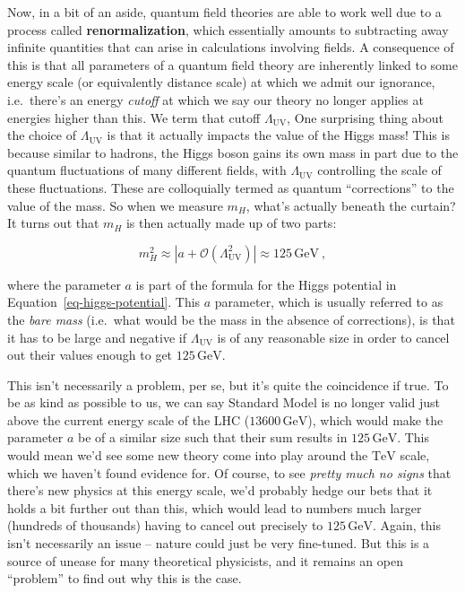 \documentclass[
  11pt,
  numbers=noendperiod]{book}
\begin{document}
Now, in a bit of an aside, quantum field theories are able to work well
due to a process called \textbf{renormalization}, which essentially
amounts to subtracting away infinite quantities that can arise in
calculations involving fields. A consequence of this is that all
parameters of a quantum field theory are inherently linked to some
energy scale (or equivalently distance scale) at which we admit our
ignorance, i.e.~there's an energy \emph{cutoff} at which we say our
theory no longer applies at energies higher than this. We term that
cutoff \(\Lambda_{\text{UV}}\), One surprising thing about the choice of
\(\Lambda_{\text{UV}}\) is that it actually impacts the value of the
Higgs mass! This is because similar to hadrons, the Higgs boson gains
its own mass in part due to the quantum fluctuations of many different
fields, with \(\Lambda_{\text{UV}}\) controlling the scale of these
fluctuations. These are colloquially termed as quantum ``corrections''
to the value of the mass. So when we measure \(m_H\), what's actually
beneath the curtain? It turns out that \(m_H\) is then actually made up
of two parts:

\[
m_H^2 \approx\left|a+\mathcal{O}\left(\Lambda_{\mathrm{UV}}^2\right)\right| \approx 125 \,\text{GeV}~,
\]

where the parameter \(a\) is part of the formula for the Higgs potential
in Equation~\ref{eq-higgs-potential}. This \(a\) parameter, which is
usually referred to as the \emph{bare mass} (i.e.~what would be the mass
in the absence of corrections), is that it has to be large and negative
if \(\Lambda_{\mathrm{UV}}\) is of any reasonable size in order to
cancel out their values enough to get \(125\,\text{GeV}\).

This isn't necessarily a problem, per se, but it's quite the coincidence
if true. To be as kind as possible to us, we can say Standard Model is
no longer valid just above the current energy scale of the LHC
(\(13600 \,\text{GeV}\)), which would make the parameter \(a\) be of a
similar size such that their sum results in \(125\,\text{GeV}\). This
would mean we'd see some new theory come into play around the
\(\text{TeV}\) scale, which we haven't found evidence for. Of course, to
see \emph{pretty much no signs} that there's new physics at this energy
scale, we'd probably hedge our bets that it holds a bit further out than
this, which would lead to numbers much larger (hundreds of thousands)
having to cancel out precisely to \(125\,\text{GeV}\). Again, this isn't
necessarily an issue -- nature could just be very fine-tuned. But this
is a source of unease for many theoretical physicists, and it remains an
open ``problem'' to find out why this is the case.
\end{document}
